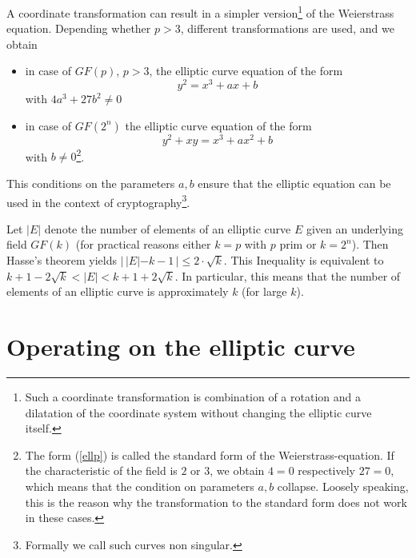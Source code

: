 A coordinate transformation can result in a simpler version\footnote{Such a coordinate transformation is combination of a rotation and a dilatation of the coordinate system without changing the elliptic curve itself.} of the Weierstrass equation. Depending whether $p>3$, different transformations are used, and we obtain
\begin{itemize}
\item in case of $GF(p)$, $p>3$, the elliptic curve equation of the form
\begin{equation}
 y^2 = x^3 + ax + b
\label{ellp}
\end{equation}
with $4a^3+27b^2\ne 0$
\item in case of $GF(2^n)$ the elliptic curve equation of the form 
\begin{equation}
 y^2+xy = x^3 + ax^2 + b
\label{ell2}
\end{equation}
with $b\ne 0$\footnote{The form (\ref{ellp}) is called the standard form of the Weierstrass-equation. If the characteristic of the field is $2$ or $3$, we obtain $4=0$ respectively $27=0$, which means that the condition on parameters $a,b$ collapse. Loosely speaking, this is the reason why the transformation to the standard form does not work in these cases.}.
\end{itemize}
This conditions on the parameters $a,b$ ensure that the elliptic equation can be used in the context of cryptography\footnote{Formally we call such curves non singular.}.

Let $|E|$ denote the number of elements of an elliptic curve $E$ given an underlying field $GF(k)$ (for practical reasons either $k=p$ with $p$ prim or $k=2^n$). Then Hasse's theorem\cite{ec:Silverman1986} yields $| \, |E| - k-1\,| \le 2\cdot \sqrt{k}$. This Inequality is equivalent to $k+1 - 2\sqrt{k} < |E| < k+1+2\sqrt{k}$. In particular, this means that the number of elements of an elliptic curve is approximately $k$ (for large $k$). 

\section{Operating on the elliptic curve}

